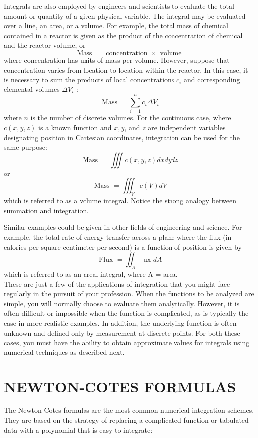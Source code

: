 \documentclass[../main.tex]{subfiles}
\begin{document}
		Integrals are also employed by engineers and scientists to evaluate the total amount or
		quantity of a given physical variable. The integral may be evaluated over a line, an area, or
		a volume. For example, the total mass of chemical contained in a reactor is given as the
		product of the concentration of chemical and the reactor volume, or
		$$
		\text { Mass }= \text { concentration } \times \text { volume }
		$$
		where concentration has units of mass per volume. However, suppose that concentration varies from location to location within the reactor. In this case, it is necessary to sum the products of local concentrations $c_{i}$ and corresponding elemental volumes $\Delta V_{i}$ :
		$$
		\text { Mass }=\sum_{i=1}^{n} c_{i} \Delta V_{i}
		$$
		where $n$ is the number of discrete volumes. For the continuous case, where $c(x, y, z)$ is a known function and $x, y$, and $z$ are independent variables designating position in Cartesian coordinates, integration can be used for the same purpose:
		$$
		\text { Mass }=\iiint c(x, y, z) d x d y d z
		$$
		or
		$$
		\text { Mass }=\iiint_{V} c(V) d V
		$$
		which is referred to as a volume integral. Notice the strong analogy between summation and integration.
		
		Similar examples could be given in other fields of engineering and science. For example, the total rate of energy transfer across a plane where the flux (in calories per square centimeter per second) is a function of position is given by
		$$
		\text { Flux }=\iint_{A} \text { ux } d A
		$$
		which is referred to as an areal integral, where A = area.\\
		These are just a few of the applications of integration that you might face regularly in
		the pursuit of your profession. When the functions to be analyzed are simple, you will normally choose to evaluate them analytically. However, it is often difficult or impossible
		when the function is complicated, as is typically the case in more realistic examples. In addition, the underlying function is often unknown and defined only by measurement at discrete points. For both these cases, you must have the ability to obtain approximate values
		for integrals using numerical techniques as described next.

		\section{NEWTON-COTES FORMULAS}
		The Newton-Cotes formulas are the most common numerical integration schemes. They
		are based on the strategy of replacing a complicated function or tabulated data with a polynomial that is easy to integrate:
\end{document}

